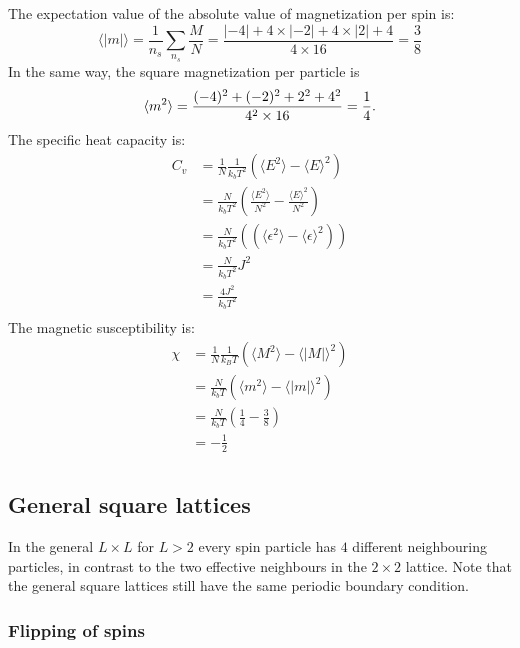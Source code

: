 \documentclass[english,notitlepage,reprint,nofootinbib]{revtex4-1}  %
\begin{document}
The expectation value of the absolute value of magnetization per spin is:
\begin{equation}
	\langle |m| \rangle = \frac{1}{n_s}\sum_{n_s} \frac{M}{N} = \frac{|-4|+4\times|-2|+4\times|2|+4}{4 \times 16} = \frac{3}{8}
\end{equation}
In the same way, the square magnetization per particle is
\begin{equation}\label{eq:mean_square_mag}
    \braket{m^2} = \frac{(-4)^2 +(-2)^2+ 2^2 +4^2}{4^2 \times 16} = \frac{1}{4}.
\end{equation}
The specific heat capacity is:
\begin{equation}
	\begin{aligned}
		C_v &= \frac{1}{N} \frac{1}{k_bT^2} (\langle E^2 \rangle - \langle E \rangle ^2) \\
		    &= \frac{N}{k_bT^2} (\frac{\langle E^2 \rangle}{N^2} - \frac{\langle E \rangle ^2}{N^2}) \\
		    &= \frac{N}{k_bT^2} ((\langle \epsilon^2 \rangle - \langle \epsilon \rangle ^2)) \\
		    &= \frac{N}{k_bT^2} J^2 \\
		    &= \frac{4J^2}{k_bT^2} \\
	\end{aligned}
\end{equation}
The magnetic susceptibility is:
\begin{equation}
	\begin{aligned}
		\chi &= \frac{1}{N} \frac{1}{k_B T}(\langle M^2 \rangle - \langle |M| \rangle^2) \\
		  &= \frac{N}{k_bT} (\langle m^2 \rangle - \langle |m| \rangle^2) \\
		  &= \frac{N}{k_bT} (\frac{1}{4}-\frac{3}{8}) \\
		  &= -\frac{1}{2} \\
	\end{aligned}
\end{equation}


\subsection{General square lattices}
In the general $L\times L$ for $L > 2$ every spin particle has $4$ different neighbouring particles, in contrast to the two effective neighbours in the $2\times 2$ lattice. Note that the general square lattices still have the same periodic boundary condition.
\subsubsection*{Flipping of spins}\label{sub:flip}
\end{document}
